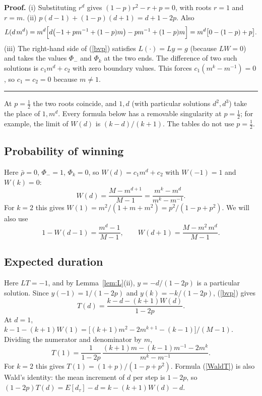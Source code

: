 \documentclass{article}%
\newenvironment{proof}[1][Proof]{\noindent\textbf{#1.} }{\ \rule{0.5em}{0.5em}}
\begin{document}
\begin{proof}
(i) Substituting $r^{d}$ gives $(1-p)r^{2}-r+p=0$, with roots $r=1$ and
$r=m$. (ii) $p(d-1)+(1-p)(d+1)=d+1-2p$. Also
\[
L(d\,m^{d})=m^{d}\Bigl[d\bigl(-1+pm^{-1}+(1-p)m\bigr)-pm^{-1}+(1-p)m\Bigr]%
=m^{d}\bigl[0-(1-p)+p\bigr].
\]
(iii) The right-hand side of (\ref{bvp}) satisfies $L(\cdot)=Ly=g$ (because
$LW=0$) and takes the values $\Phi_{-}$ and $\Phi_{k}$ at the two ends. The
difference of two such solutions is $c_{1}m^{d}+c_{2}$ with zero boundary
values. This forces $c_{1}(m^{k}-m^{-1})=0$, so $c_{1}=c_{2}=0$ because
$m\neq1$.
\end{proof}

At $p=\frac{1}{2}$ the two roots coincide, and $1,d$ (with particular
solutions $d^{2},d^{3}$) take the place of $1,m^{d}$. Every formula below has
a removable singularity at $p=\frac{1}{2}$; for example, the limit of $W(d)$
is $(k-d)/(k+1)$. The tables do not use $p=\frac{1}{2}$.

\subsection{Probability of winning}

Here $\bar{\rho}=0$, $\Phi_{-}=1$, $\Phi_{k}=0$, so $W(d)=c_{1}m^{d}+c_{2}$
with $W(-1)=1$ and $W(k)=0$:%
\begin{equation}
W(d)=\frac{M-m^{d+1}}{M-1}=\frac{m^{k}-m^{d}}{m^{k}-m^{-1}}. \label{Awin}%
\end{equation}
For $k=2$ this gives $W(1)=m^{2}/(1+m+m^{2})=p^{2}/(1-p+p^{2})$. We will also
use
\[
1-W(d-1)=\frac{m^{d}-1}{M-1},\qquad W(d+1)=\frac{M-m^{2}\,m^{d}}{M-1}.
\]

\subsection{Expected duration}

Here $LT=-1$, and by Lemma~\ref{lem:L}(ii), $y=-d/(1-2p)$ is a particular
solution. Since $y(-1)=1/(1-2p)$ and $y(k)=-k/(1-2p)$, (\ref{bvp}) gives%
\begin{equation}
T(d)=\frac{k-d-(k+1)W(d)}{1-2p}. \label{WaldT}%
\end{equation}
At $d=1$, $k-1-(k+1)W(1)=\bigl[(k+1)m^{2}-2m^{k+1}-(k-1)\bigr]/(M-1)$.
Dividing the numerator and denominator by $m$,%
\begin{equation}
T(1)=\frac{1}{1-2p}\,\frac{(k+1)m-(k-1)m^{-1}-2m^{k}}{m^{k}-m^{-1}}.
\label{fullT}%
\end{equation}
For $k=2$ this gives $T(1)=(1+p)/(1-p+p^{2})$. Formula (\ref{WaldT}) is also
Wald's identity: the mean increment of $d$ per step is $1-2p$, so
$(1-2p)T(d)=E[d_{\tau}]-d=k-(k+1)W(d)-d$.
\end{document}
